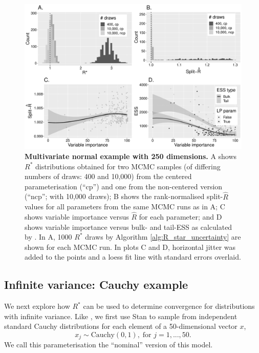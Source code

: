 \documentclass[ba]{imsart}
\numberwithin{equation}{section}
\theoremstyle{plain}
\begin{document}
\begin{figure}[!htb]
	\centerline{\includegraphics[width=1\textwidth]{mvt_three.pdf}}
	\caption{\textbf{Multivariate normal example with 250 dimensions.} A shows $R^*$ distributions obtained for two MCMC samples (of differing numbers of draws: 400 and 10,000) from the centered parameterisation (``cp'') and one from the non-centered version (``ncp''; with 10,000 draws); B shows the rank-normalised split-$\widehat{R}$ values for all parameters from the same MCMC runs as in A; C shows variable importance versus $\widehat{R}$ for each parameter; and D shows variable importance versus bulk- and tail-ESS as calculated by \cite{vehtari2019rank}. In A, 1000 $R^*$ draws by Algorithm \ref{alg:R_star_uncertainty} are shown for each MCMC run. In plots C and D, horizontal jitter was added to the points and a loess fit line with standard errors overlaid.}
	\label{fig:mvt}
\end{figure}

\subsection{Infinite variance: Cauchy example}\label{sec:cauchy}
We next explore how $R^*$ can be used to determine convergence for distributions with infinite variance. Like \cite{vehtari2019rank}, we first use Stan to sample from independent standard Cauchy distributions for each element of a 50-dimensional vector $x$,
%
\begin{equation}
x_j\sim \text{Cauchy}(0, 1),\; \text{for } j=1,...,50.
\end{equation}
%
We call this parameterisation the ``nominal'' version of this model.
\end{document}

